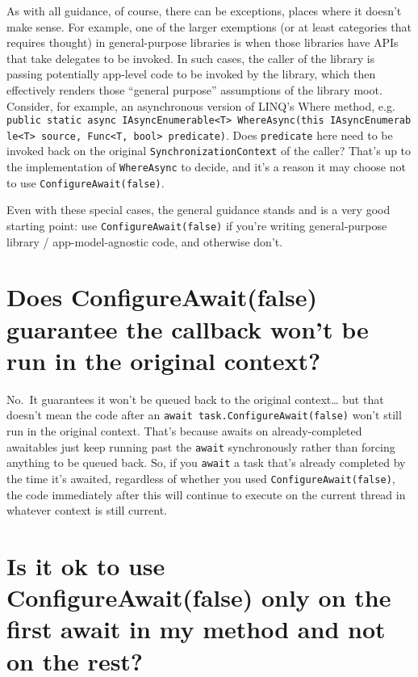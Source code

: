 \documentclass[a4paper,12pt,notitlepage,twoside,openright]{article}
\begin{document}
As with all guidance, of course, there can be exceptions, places where
it doesn't make sense. For example, one of the larger exemptions (or at
least categories that requires thought) in general-purpose libraries is
when those libraries have APIs that take delegates to be invoked. In
such cases, the caller of the library is passing potentially app-level
code to be invoked by the library, which then effectively renders those
``general purpose'' assumptions of the library moot. Consider, for
example, an asynchronous version of LINQ's Where method, e.g.
\texttt{public\ static\ async\ IAsyncEnumerable\textless{}T\textgreater{}\ WhereAsync(this\ IAsyncEnumerable\textless{}T\textgreater{}\ source,\ Func\textless{}T,\ bool\textgreater{}\ predicate)}.
Does \texttt{predicate} here need to be invoked back on the original
\texttt{SynchronizationContext} of the caller? That's up to the
implementation of \texttt{WhereAsync} to decide, and it's a reason it
may choose not to use \texttt{ConfigureAwait(false)}.

Even with these special cases, the general guidance stands and is a very
good starting point: use \texttt{ConfigureAwait(false)} if you're
writing general-purpose library / app-model-agnostic code, and otherwise
don't.

\hypertarget{does-configureawaitfalse-guarantee-the-callback-wont-be-run-in-the-original-context}{%
\section{Does ConfigureAwait(false) guarantee the callback won't be
run in the original
context?}\label{does-configureawaitfalse-guarantee-the-callback-wont-be-run-in-the-original-context}}

No.~It guarantees it won't be queued back to the original
context\ldots{} but that doesn't mean the code after an
\texttt{await\ task.ConfigureAwait(false)} won't still run in the
original context. That's because awaits on already-completed awaitables
just keep running past the \texttt{await} synchronously rather than
forcing anything to be queued back. So, if you \texttt{await} a task
that's already completed by the time it's awaited, regardless of whether
you used \texttt{ConfigureAwait(false)}, the code immediately after this
will continue to execute on the current thread in whatever context is
still current.

\hypertarget{is-it-ok-to-use-configureawaitfalse-only-on-the-first-await-in-my-method-and-not-on-the-rest}{%
\section{Is it ok to use ConfigureAwait(false) only on the first
await in my method and not on the
rest?}\label{is-it-ok-to-use-configureawaitfalse-only-on-the-first-await-in-my-method-and-not-on-the-rest}}
\end{document}
